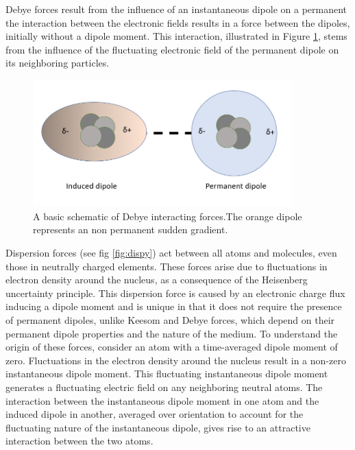 Debye forces result from the influence of an instantaneous dipole on a permanent 
the interaction between the electronic fields results in a force between the dipoles, initially without a dipole moment. This interaction, illustrated in Figure \ref{fig:debye}, stems from the influence of the fluctuating electronic field of the permanent dipole on its neighboring particles.

\begin{figure}[h!]     %
        \begin{center}
          \includegraphics[width=100mm]{chapter1/debye.PNG}
\end{center}
\caption{A basic schematic of Debye interacting forces.The orange dipole represents an non permanent sudden gradient.}
\label{fig:debye}                 %
\end{figure}

Dispersion forces (see fig \ref{fig:dispy}) act between all atoms and molecules, even those in neutrally charged elements. These forces arise due to fluctuations in electron density around the nucleus, as a consequence of the Heisenberg uncertainty principle.\cite{heisenberg1927uber} \cite{griffiths2005} This dispersion force is caused by an electronic charge flux inducing a dipole moment and is unique in that it does not require the presence of permanent dipoles, unlike Keesom and Debye forces, which depend on their permanent dipole properties and the nature of the medium. \cite{IsGreenBook} To understand the origin of these forces, consider an atom with a time-averaged dipole moment of zero. Fluctuations in the electron density around the nucleus result in a non-zero instantaneous dipole moment. This fluctuating instantaneous dipole moment generates a fluctuating electric field on any neighboring neutral atoms. The interaction between the instantaneous dipole moment in one atom and the induced dipole in another, averaged over orientation to account for the fluctuating nature of the instantaneous dipole, gives rise to an attractive interaction between the two atoms. 

